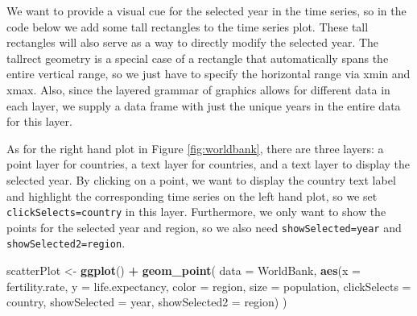 \documentclass[12pt,]{article}
\newenvironment{Shaded}{\begin{snugshade}}{\end{snugshade}}
\newcommand{\KeywordTok}[1]{\textcolor[rgb]{0.13,0.29,0.53}{\textbf{#1}}}
\newcommand{\DataTypeTok}[1]{\textcolor[rgb]{0.13,0.29,0.53}{#1}}
\newcommand{\FloatTok}[1]{\textcolor[rgb]{0.00,0.00,0.81}{#1}}
\newcommand{\StringTok}[1]{\textcolor[rgb]{0.31,0.60,0.02}{#1}}
\newcommand{\OperatorTok}[1]{\textcolor[rgb]{0.81,0.36,0.00}{\textbf{#1}}}
\newcommand{\NormalTok}[1]{#1}
\theoremstyle{definition}
\theoremstyle{definition}
\theoremstyle{remark}
\begin{document}
We want to provide a visual cue for the selected year in the time
series, so in the code below we add some tall rectangles to the time
series plot. These tall rectangles will also serve as a way to directly
modify the selected year. The tallrect geometry is a special case of a
rectangle that automatically spans the entire vertical range, so we just
have to specify the horizontal range via xmin and xmax. Also, since the
layered grammar of graphics allows for different data in each layer, we
supply a data frame with just the unique years in the entire data for
this layer.

\begin{Shaded}
\end{Shaded}

As for the right hand plot in Figure \ref{fig:worldbank}, there are
three layers: a point layer for countries, a text layer for countries,
and a text layer to display the selected year. By clicking on a point,
we want to display the country text label and highlight the
corresponding time series on the left hand plot, so we set
\texttt{clickSelects=country} in this layer. Furthermore, we only want
to show the points for the selected year and region, so we also need
\texttt{showSelected=year} and \texttt{showSelected2=region}.

\begin{Shaded}
\begin{Highlighting}[]
\NormalTok{scatterPlot <-}\StringTok{ }\KeywordTok{ggplot}\NormalTok{() }\OperatorTok{+}\StringTok{ }\KeywordTok{geom_point}\NormalTok{(}
  \DataTypeTok{data =}\NormalTok{ WorldBank,}
  \KeywordTok{aes}\NormalTok{(}\DataTypeTok{x =}\NormalTok{ fertility.rate, }\DataTypeTok{y =}\NormalTok{ life.expectancy,}
      \DataTypeTok{color =}\NormalTok{ region, }\DataTypeTok{size =}\NormalTok{ population,}
      \DataTypeTok{clickSelects =}\NormalTok{ country,}
      \DataTypeTok{showSelected =}\NormalTok{ year,}
      \DataTypeTok{showSelected2 =}\NormalTok{ region)}
\NormalTok{)}
\end{Highlighting}
\end{Shaded}
\end{document}
